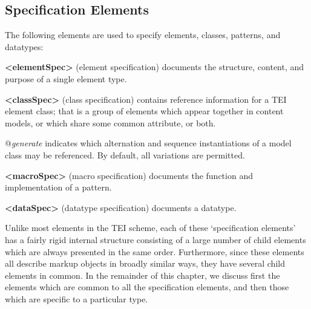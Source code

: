 \subsection[{Specification Elements}]{Specification Elements}\label{TDcrystals}\par
The following elements are used to specify elements, classes, patterns, and datatypes: 
\begin{sansreflist}
  
\item [\textbf{<elementSpec>}] (element specification) documents the structure, content, and purpose of a single element type.
\item [\textbf{<classSpec>}] (class specification) contains reference information for a TEI element class; that is a group of elements which appear together in content models, or which share some common attribute, or both.\hfil\\[-10pt]\begin{sansreflist}
    \item[@{\itshape generate}]
  indicates which alternation and sequence instantiations of a model class may be referenced. By default, all variations are permitted.
\end{sansreflist}  
\item [\textbf{<macroSpec>}] (macro specification) documents the function and implementation of a pattern.
\item [\textbf{<dataSpec>}] (datatype specification) documents a datatype.
\end{sansreflist}
\par
Unlike most elements in the TEI scheme, each of these ‘specification elements’ has a fairly rigid internal structure consisting of a large number of child elements which are always presented in the same order. Furthermore, since these elements all describe markup objects in broadly similar ways, they have several child elements in common. In the remainder of this chapter, we discuss first the elements which are common to all the specification elements, and then those which are specific to a particular type.\par
